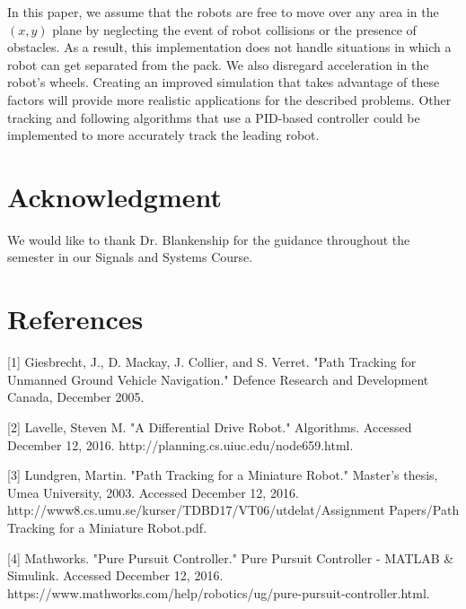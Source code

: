 \documentclass[journal]{IEEEtran}
\begin{document}
    In this paper, we assume that the robots are free to move over any area in the $\left(x,y\right)$ plane by neglecting the event of robot collisions or the presence of obstacles. As a result, this implementation does not handle situations in which a robot can get separated from the pack. We also disregard acceleration in the robot's wheels. Creating an improved simulation that takes advantage of these factors will provide more realistic applications for the described problems. Other tracking and following algorithms that use a PID-based controller could be implemented to more accurately track the leading robot.

\section*{Acknowledgment}
    We would like to thank Dr. Blankenship for the guidance throughout the semester in our Signals and Systems Course.

\section*{References}
    [1] Giesbrecht, J., D. Mackay, J. Collier, and S. Verret. "Path Tracking for Unmanned Ground Vehicle Navigation." Defence Research and Development Canada, December 2005. 
    
    [2] Lavelle, Steven M. "A Differential Drive Robot." Algorithms. Accessed December 12, 2016. http://planning.cs.uiuc.edu/node659.html.
    
    [3] Lundgren, Martin. "Path Tracking for a Miniature Robot." Master's thesis, Umea University, 2003. Accessed December 12, 2016. http://www8.cs.umu.se/kurser/TDBD17/VT06/utdelat/Assignment Papers/Path Tracking for a Miniature Robot.pdf.
    
    [4] Mathworks. "Pure Pursuit Controller." Pure Pursuit Controller - MATLAB \& Simulink. Accessed December 12, 2016. https://www.mathworks.com/help/robotics/ug/pure-pursuit-controller.html.
        
\end{document}

